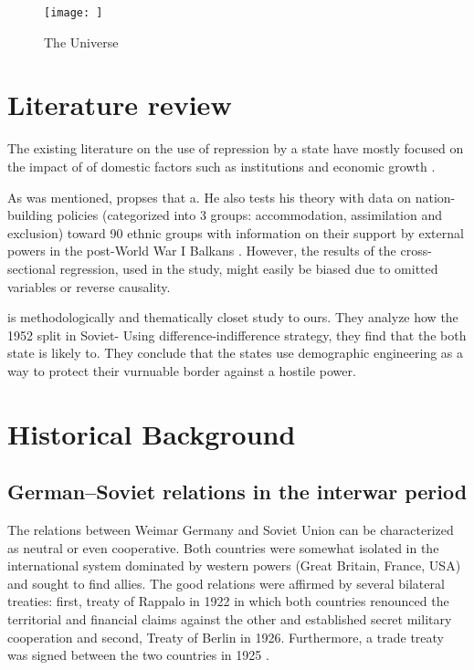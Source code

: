 \documentclass[12pt]{article}
\begin{document}





\begin{figure}[h!]
\centering
\texttt{[image: ]}
\caption{The Universe}
\label{fig:universe}
\end{figure}
\section{Literature review}
The existing literature on the use of repression by a state have mostly focused on the impact of  of domestic factors such as institutions and economic growth \citep{davenport_state_2007, davenport_state_2007-1}.

As was mentioned, \citet{mylonas_politics_2013} propses that a. He also tests his theory with data on nation-building policies (categorized into 3 groups: accommodation, assimilation and exclusion)  toward  90 ethnic groups with information on their support by external powers in the post-World War I Balkans . However, the results of the cross-sectional regression, used in the study, might easily be biased due to omitted variables or reverse causality. 

 \citet{blaydes_state_2018} 

\citet{mcnamee_demographic_nodate} is methodologically and thematically closet study to ours. They analyze how the 1952 split in Soviet-
Using difference-indifference strategy, they find that the both state is likely to. They conclude that the states use demographic engineering as a way to protect their vurnuable border against a hostile power. 

\section{Historical Background}
\subsection{German–Soviet relations in the interwar period}
The relations between Weimar Germany and Soviet Union can be characterized as neutral or even cooperative. Both countries were somewhat isolated in the international system dominated by western powers (Great Britain, France, USA) and sought to find allies. The good relations were affirmed by several bilateral treaties: first, treaty of Rappalo in 1922 in which both countries renounced the territorial and financial claims against the other and established secret military cooperation and second, Treaty of Berlin in 1926. Furthermore, a trade treaty was signed between the two countries in 1925 \citep{morgan_political_1963}.
\end{document}
